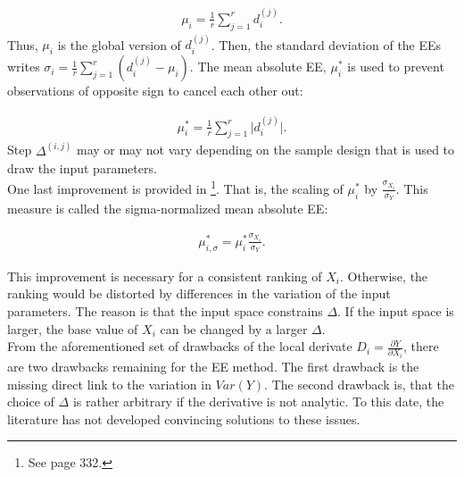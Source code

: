 \documentclass[a4paper,12pt]{article}
\begin{document}
\begin{align}
\mu_i = \frac{1}{r} \sum_{j=1}^{r} d_i^{(j)}.
\end{align}
\noindent
Thus, $\mu_i$ is the global version of $d_i^{(j)}$. Then, the standard deviation of the EEs writes $\sigma_i = \frac{1}{r} \sum_{j=1}^{r} (d_i^{(j)} - \mu_i)$. The mean absolute EE, $\mu_i^*$ is used to prevent observations of opposite sign to cancel each other out:

\begin{align}
\mu_i^* = \frac{1}{r} \sum_{j=1}^{r} \big| d_i^{(j)} \big|.
\end{align}
\noindent
Step $\Delta^{(i,j)}$ may or may not vary depending on the sample design that is used to draw the input parameters.\\


\noindent
One last improvement is provided in \cite{Smith.2014}\footnote{See page 332.}. That is, the scaling of $\mu_{i}^*$ by $\frac{\sigma_{X_i}}{\sigma_Y}$. This measure is called the sigma-normalized mean absolute EE: 


\begin{align}
\mu_{i,\sigma}^* = \mu_i^* \frac{\sigma_{X_i}}{\sigma_Y}.
\end{align}

\noindent
This improvement is necessary for a consistent ranking of $X_i$. Otherwise, the ranking would be distorted by differences in the variation of the input parameters. The reason is that the input space constrains $\Delta$. If the input space is larger, the base value of $X_i$ can be changed by a larger $\Delta$.\\


\noindent
From the aforementioned set of drawbacks of the local derivate $D_i = \frac{\partial Y}{\partial X_i}$, there are two drawbacks remaining for the EE method. The first drawback is the missing direct link to the variation in $Var(Y)$. The second drawback is, that the choice of $\Delta$ is rather arbitrary if the derivative is not analytic. To this date, the literature has not developed convincing solutions to these issues.
\end{document}
